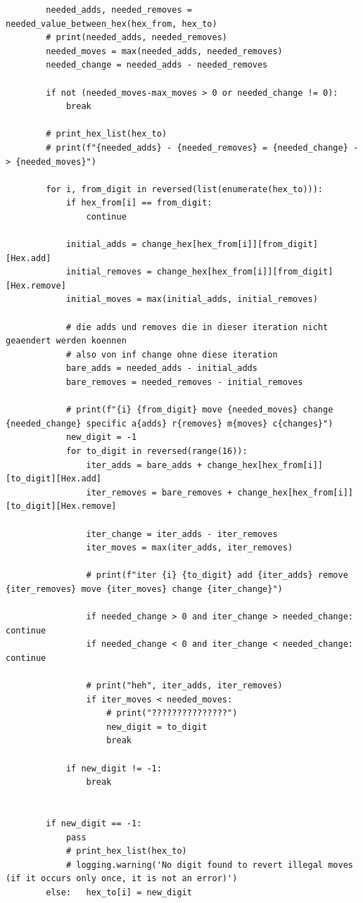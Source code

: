 \documentclass[a4paper,10pt,ngerman]{scrartcl}
\begin{document}
\begin{lstlisting}
        needed_adds, needed_removes = needed_value_between_hex(hex_from, hex_to)
        # print(needed_adds, needed_removes)
        needed_moves = max(needed_adds, needed_removes)
        needed_change = needed_adds - needed_removes

        if not (needed_moves-max_moves > 0 or needed_change != 0):
            break

        # print_hex_list(hex_to)
        # print(f"{needed_adds} - {needed_removes} = {needed_change} -> {needed_moves}")

        for i, from_digit in reversed(list(enumerate(hex_to))):
            if hex_from[i] == from_digit:
                continue

            initial_adds = change_hex[hex_from[i]][from_digit][Hex.add]
            initial_removes = change_hex[hex_from[i]][from_digit][Hex.remove]
            initial_moves = max(initial_adds, initial_removes)

            # die adds und removes die in dieser iteration nicht geaendert werden koennen
            # also von inf change ohne diese iteration
            bare_adds = needed_adds - initial_adds
            bare_removes = needed_removes - initial_removes

            # print(f"{i} {from_digit} move {needed_moves} change {needed_change} specific a{adds} r{removes} m{moves} c{changes}")
            new_digit = -1
            for to_digit in reversed(range(16)):
                iter_adds = bare_adds + change_hex[hex_from[i]][to_digit][Hex.add]
                iter_removes = bare_removes + change_hex[hex_from[i]][to_digit][Hex.remove]

                iter_change = iter_adds - iter_removes
                iter_moves = max(iter_adds, iter_removes)

                # print(f"iter {i} {to_digit} add {iter_adds} remove {iter_removes} move {iter_moves} change {iter_change}")

                if needed_change > 0 and iter_change > needed_change:   continue
                if needed_change < 0 and iter_change < needed_change:   continue

                # print("heh", iter_adds, iter_removes)
                if iter_moves < needed_moves:
                    # print("???????????????")
                    new_digit = to_digit
                    break

            if new_digit != -1:
                break


        if new_digit == -1:
            pass
            # print_hex_list(hex_to)
            # logging.warning('No digit found to revert illegal moves (if it occurs only once, it is not an error)')
        else:   hex_to[i] = new_digit



\end{lstlisting}
\end{document}
